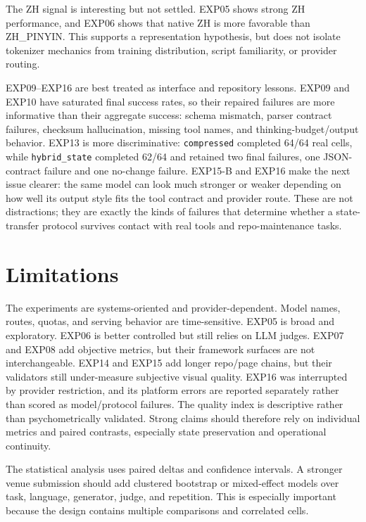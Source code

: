 \documentclass[11pt]{article}
\begin{document}
The ZH signal is interesting but not settled. EXP05 shows strong ZH performance, and EXP06 shows that native ZH is more favorable than ZH\_PINYIN. This supports a representation hypothesis, but does not isolate tokenizer mechanics from training distribution, script familiarity, or provider routing.

EXP09--EXP16 are best treated as interface and repository lessons. EXP09 and EXP10 have saturated final success rates, so their repaired failures are more informative than their aggregate success: schema mismatch, parser contract failures, checksum hallucination, missing tool names, and thinking-budget/output behavior. EXP13 is more discriminative: \texttt{compressed} completed 64/64 real cells, while \texttt{hybrid\_state} completed 62/64 and retained two final failures, one JSON-contract failure and one no-change failure. EXP15-B and EXP16 make the next issue clearer: the same model can look much stronger or weaker depending on how well its output style fits the tool contract and provider route. These are not distractions; they are exactly the kinds of failures that determine whether a state-transfer protocol survives contact with real tools and repo-maintenance tasks.

\section{Limitations}
The experiments are systems-oriented and provider-dependent. Model names, routes, quotas, and serving behavior are time-sensitive. EXP05 is broad and exploratory. EXP06 is better controlled but still relies on LLM judges. EXP07 and EXP08 add objective metrics, but their framework surfaces are not interchangeable. EXP14 and EXP15 add longer repo/page chains, but their validators still under-measure subjective visual quality. EXP16 was interrupted by provider restriction, and its platform errors are reported separately rather than scored as model/protocol failures. The quality index is descriptive rather than psychometrically validated. Strong claims should therefore rely on individual metrics and paired contrasts, especially state preservation and operational continuity.

The statistical analysis uses paired deltas and confidence intervals. A stronger venue submission should add clustered bootstrap or mixed-effect models over task, language, generator, judge, and repetition. This is especially important because the design contains multiple comparisons and correlated cells.
\end{document}
